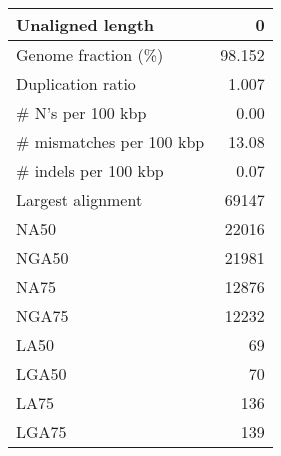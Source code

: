 \documentclass[12pt,a4paper]{article}
\begin{document}
\begin{table}[ht]
\begin{center}
\begin{tabular}{|l*{1}{|r}|}
Unaligned length & 0 \\ \hline
Genome fraction (\%) & 98.152 \\ \hline
Duplication ratio & 1.007 \\ \hline
\# N's per 100 kbp & 0.00 \\ \hline
\# mismatches per 100 kbp & 13.08 \\ \hline
\# indels per 100 kbp & 0.07 \\ \hline
Largest alignment & 69147 \\ \hline
NA50 & 22016 \\ \hline
NGA50 & 21981 \\ \hline
NA75 & 12876 \\ \hline
NGA75 & 12232 \\ \hline
LA50 & 69 \\ \hline
LGA50 & 70 \\ \hline
LA75 & 136 \\ \hline
LGA75 & 139 \\ \hline
\end{tabular}
\end{center}
\end{table}
\end{document}
